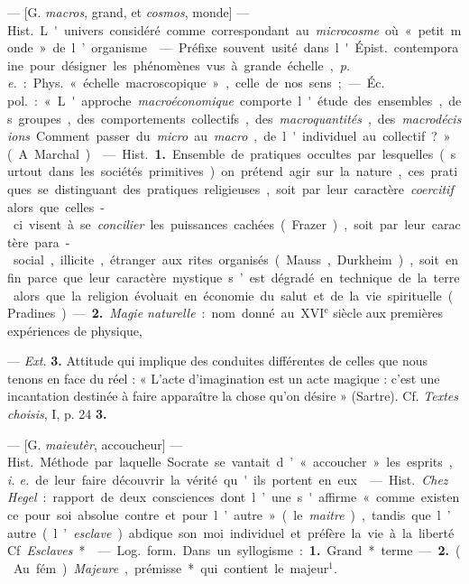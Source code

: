 
	\begin{itemize}[leftmargin=1cm, label=, itemsep=1pt]

 — [G. {\it macros}, grand, et {\it cosmos}, monde] — \si{Hist.} L'univers considéré comme correspondant au
{\it microcosme} où « petit monde » de l’organisme.

 — Préfixe souvent usité dans l'\si{Épist.} contemporaine pour
désigner les phénomènes vus à grande échelle, {\it p. e.} : \si{Phys.}
« échelle macroscopique », celle de nos sens ; — \si{Éc. pol.} : « L'approche
{\it macroéconomique} comporte l'étude des ensembles, des groupes, des
comportements collectifs, des {\it macroquantités}, des
{\it macrodécisions}... Comment passer du {\it micro} au {\it macro}, de
l'individuel au collectif ? » (A. Marchal).

 — \si{Hist.} {\bf 1.} Ensemble de pratiques occultes par
lesquelles (surtout dans les sociétés primitives) on prétend agir sur la
nature, ces pratiques se distinguant des pratiques religieuses, soit par leur
caractère {\it coercitif} alors que celles-ci visent à se {\it concilier} les
puissances cachées (Frazer), soit par leur caractère para-social, illicite,
étranger aux rites organisés (Mauss, Durkheim), soit enfin parce que leur
caractère mystique s’est dégradé en technique de la terre alors que la
religion évoluait en économie du salut et de la vie spirituelle (Pradines). —
{\bf 2.} {\it Magie naturelle} : nom donné au {\footnotesize XVI}$^\text{e}$
siècle aux premières expériences de physique,

— {\it Ext.} {\bf 3.} Attitude qui implique des conduites différentes de
celles que nous tenons en face du réel : « L’acte d'imagination est un acte
magique : c’est une incantation destinée à faire apparaître la chose qu’on
désire » (Sartre). Cf. {\it Textes choisis}, I, p. 24 {\bf 3.}

 — [G. {\it maieutèr}, accoucheur] — \si{Hist.} Méthode par
laquelle Socrate se vantait d’ « accoucher » les esprits, {\it i. e.} de leur
faire découvrir la vérité qu'ils portent en eux.

 — \si{Hist.} {\it Chez Hegel} : rapport de deux
consciences dont l’une s'affirme « comme existence pour soi absolue contre et
pour l’autre » (le {\it maitre}), tandis que l’autre (l’{\it esclave})
abdique son moi individuel et préfère la vie à la liberté. Cf.
{\it Esclaves}*.

 — \si{Log.} \si{form.} Dans un syllogisme : {\bf 1.} Grand*
terme. — {\bf 2.} (Au fém.). {\it Majeure}, prémisse* qui contient le
majeur$^1$.


\end{itemize}
